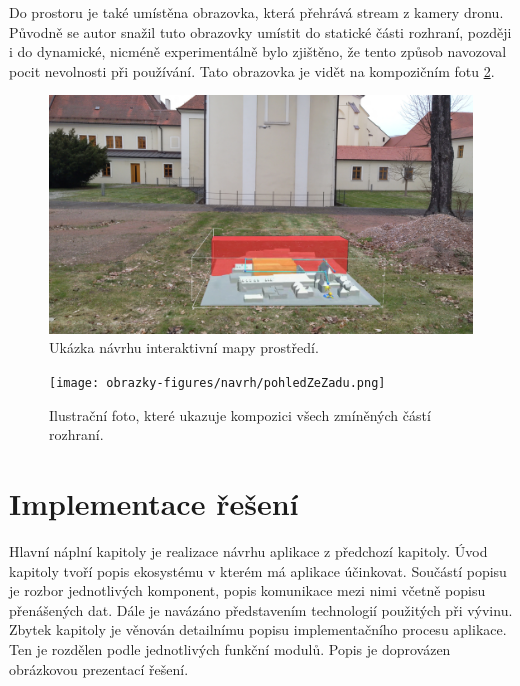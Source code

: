 Do prostoru je také umístěna obrazovka, která přehrává stream z kamery dronu. Původně se autor snažil tuto obrazovky umístit do statické části rozhraní, později i do dynamické, nicméně experimentálně bylo zjištěno, že tento způsob navozoval pocit nevolnosti při používání. Tato obrazovka je vidět na kompozičním fotu \ref{pic:ShowcaseNavrhBackView}.

\begin{figure}[!ht]
    \centering
    \includegraphics[width=\linewidth]{obrazky-figures/navrh/interaktiveMap.jpg}
    \caption{Ukázka návrhu interaktivní mapy prostředí.}
    \label{pic:MapaNavrh}
\end{figure}

\begin{figure}[!ht]
    \centering
    \texttt{[image: obrazky-figures/navrh/pohledZeZadu.png]}
    \caption{Ilustrační foto, které ukazuje kompozici všech zmíněných částí rozhraní.}
    \label{pic:ShowcaseNavrhBackView}
\end{figure}




\chapter{Implementace řešení}
Hlavní náplní kapitoly je realizace návrhu aplikace z předchozí kapitoly. Úvod kapitoly tvoří popis ekosystému v kterém má aplikace účinkovat. Součástí popisu je rozbor jednotlivých komponent, popis komunikace mezi nimi včetně popisu přenášených dat. Dále je navázáno představením technologií použitých při vývinu. Zbytek kapitoly je věnován detailnímu popisu implementačního procesu aplikace. Ten je rozdělen podle jednotlivých funkční modulů. Popis je doprovázen obrázkovou prezentací řešení.
